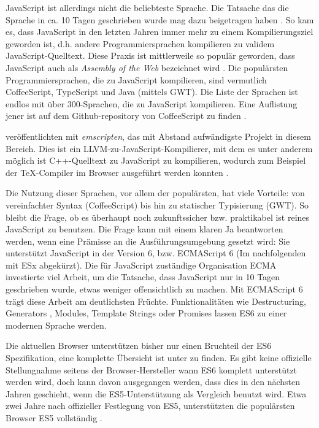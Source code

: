 \documentclass[12pt,twoside]{book}
\begin{document}
JavaScript ist allerdings nicht die beliebteste Sprache. Die Tatsache das die Sprache in ca. 10 Tagen geschrieben wurde mag dazu beigetragen haben \citep{severance2012javascript}. So kam es, dass JavaScript in den letzten Jahren immer mehr zu einem Kompilierungsziel geworden ist, d.h. andere Programmiersprachen kompilieren zu validem JavaScript-Quelltext. Diese Praxis ist mittlerweile so populär geworden, dass JavaScript auch als \textit{Assembly of the Web} bezeichnet wird \cite{webassembly}. Die populärsten Programmiersprachen, die zu JavaScript kompilieren, sind vermutlich CoffeeScript, TypeScript und Java (mittels GWT). Die Liste der Sprachen ist endlos mit über 300-Sprachen, die zu JavaScript kompilieren. Eine Auflistung jener ist auf dem Github-repository von CoffeeScript zu finden \cite{javascriptcompile}.

\citep{zakai2011emscripten} veröffentlichten mit \textit{emscripten}, das mit Abstand aufwändigste Projekt in diesem Bereich. Dies ist ein LLVM-zu-JavaScript-Kompilierer, mit dem es unter anderem möglich ist C++-Quelltext zu JavaScript zu kompilieren, wodurch zum Beispiel der TeX-Compiler im Browser ausgeführt werden konnten \cite{texlive}.

Die Nutzung dieser Sprachen, vor allem der populärsten, hat viele Vorteile: von vereinfachter Syntax (CoffeeScript) bis hin zu statischer Typisierung (GWT). So bleibt die Frage, ob es überhaupt noch zukunftssicher bzw. praktikabel ist reines JavaScript zu benutzen.
Die Frage kann mit einem klaren Ja beantworten werden, wenn eine Prämisse an die Ausführungsumgebung gesetzt wird: Sie unterstützt JavaScript in der Version 6, bzw. ECMAScript 6 (Im nachfolgenden mit ESx abgekürzt).
Die für JavaScript zuständige Organisation ECMA investierte viel Arbeit, um die Tatsache, dass JavaScript nur in 10 Tagen geschrieben wurde, etwas weniger offensichtlich zu machen. Mit ECMAScript 6 \cite{es6} trägt diese Arbeit am deutlichsten Früchte. Funktionalitäten wie Destructuring, Generators , Modules, Template Strings oder Promises lassen ES6 zu einer modernen Sprache werden.

Die aktuellen Browser unterstützen bisher nur einen Bruchteil der ES6 Spezifikation, eine komplette Übersicht ist unter \cite{es6features} zu finden. Es gibt keine offizielle Stellungnahme seitens der Browser-Hersteller wann ES6 komplett unterstützt werden wird, doch kann davon ausgegangen werden, dass dies in den nächsten Jahren geschieht, wenn die ES5-Unterstützung als Vergleich benutzt wird. Etwa zwei Jahre nach offizieller Festlegung von ES5, unterstützten die populärsten Browser ES5 vollständig \cite{es5adoption}.
\end{document}
